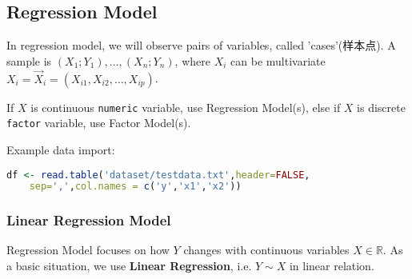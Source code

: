 \subsection{Regression Model}


    In regression model, we will observe pairs of variables, called 'cases'(样本点). A sample is $ (X_1;Y_1),\ldots,(X_n;Y_n) $, where $ X_i $ can be multivariate $ X_i=\vec{X}_i=(X_{i1},X_{i2},\ldots,X_{ip}) $.

    If $ X $ is continuous \lstinline|numeric| variable, use Regression Model(s), else if $ X $ is discrete \lstinline|factor| variable, use Factor Model(s). 

\begin{rcode}
    Example data import:
\begin{lstlisting}[language=R]
df <- read.table('dataset/testdata.txt',header=FALSE,
    sep=',',col.names = c('y','x1','x2'))
\end{lstlisting}
\end{rcode}


\subsubsection{Linear Regression Model}
    Regression Model focuses on how $ Y $ changes with continuous variables $ X\in\mathbb{R} $. As a basic situation, we use \textbf{Linear Regression}, i.e. $ Y\sim X $ in linear relation.  


